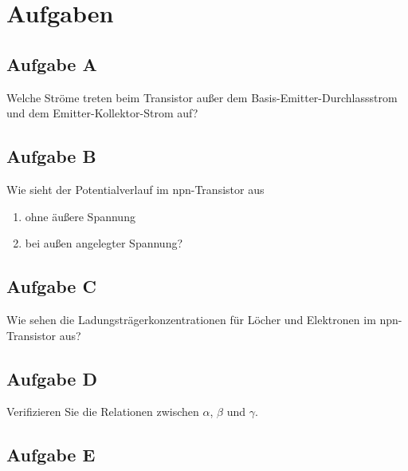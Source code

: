 \FloatBarrier
\section{Aufgaben}

\subsection{Aufgabe A}

\begin{problem}
	Welche Ströme treten beim Transistor außer dem Basis-Emitter-Durchlassstrom
	und dem Emitter-Kollektor-Strom auf?
\end{problem}

\fehlt

\subsection{Aufgabe B}

\begin{problem}
	Wie sieht der Potentialverlauf im npn-Transistor aus
	\begin{enumerate}
		\item
			ohne äußere Spannung
		\item
			bei außen angelegter Spannung?
	\end{enumerate}
\end{problem}

\fehlt

\subsection{Aufgabe C}

\begin{problem}
	Wie sehen die Ladungsträgerkonzentrationen für Löcher und Elektronen im
	npn-Transistor aus?
\end{problem}

\fehlt

\subsection{Aufgabe D}

\begin{problem}
	Verifizieren Sie die Relationen zwischen $\alpha$, $\beta$ und $\gamma$.
\end{problem}

\fehlt

\FloatBarrier
\subsection{Aufgabe E}

